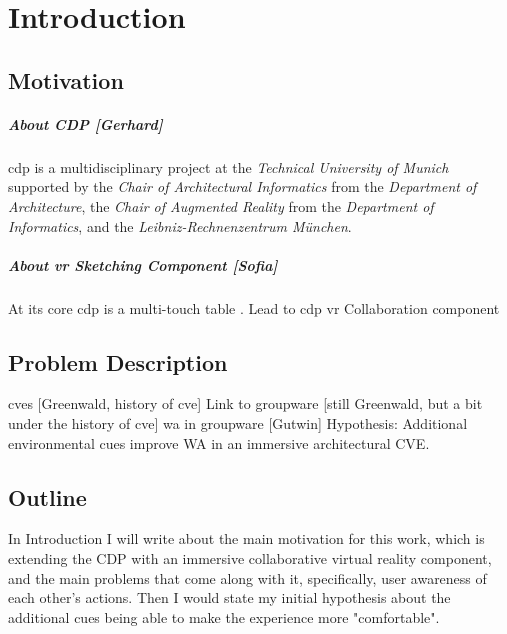 



\chapter{Introduction}

\section{Motivation}
\paragraph{About CDP [Gerhard]} \gls{cdp} is a multidisciplinary project at the \textit{Technical University of Munich} supported by the \textit{Chair of Architectural Informatics} from the \textit{Department of Architecture}, the \textit{Chair of Augmented Reality} from the \textit{Department of Informatics}, and the \textit{Leibniz-Rechnenzentrum M{\"u}nchen}.

\paragraph{About \gls{vr} Sketching Component [Sofia]} At its core \gls{cdp} is a multi-touch table \cite[p.~5]{lampe_cdp//vr-sketching_2017}.
Lead to \gls{cdp} \gls{vr} Collaboration component

\section{Problem Description}
\gls{cve}s [Greenwald, history of \gls{cve}]
Link to groupware [still Greenwald, but a bit under the history of \gls{cve}]
\gls{wa} in groupware [Gutwin]
Hypothesis: Additional environmental cues improve WA in an immersive architectural CVE.
\section{Outline}
In Introduction I will write about the main motivation for this work, which is extending the CDP with an immersive collaborative virtual reality component, and the main problems that come along with it, specifically, user awareness of each other's actions. Then I would state my initial hypothesis about the additional cues being able to make the experience more "comfortable".


